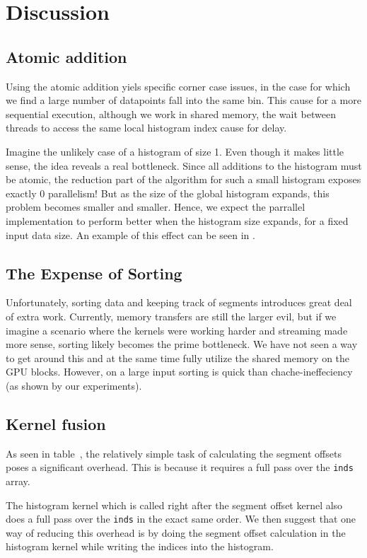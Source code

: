 \documentclass[12pt, a4paper, hidelinks]{article}
\renewcommand{\tt}[1]{\texttt{#1}}
\begin{document}
\section{Discussion}

\subsection{Atomic addition}
Using the atomic addition yiels specific corner case issues, 
in the case for which we find a large number of datapoints fall into the same bin. 
This cause for a more sequential execution, although we work in shared memory, 
the wait between threads to access the same local histogram index cause for delay.


Imagine the unlikely case of a histogram of size 1. Even though it makes little sense,
the idea reveals a real bottleneck. Since all additions to the
histogram must be atomic, the reduction part of the algorithm for
such a small histogram
exposes exactly 0 parallelism! But as the size of the global histogram
expands, this problem becomes smaller and smaller.
Hence, we expect the parrallel implementation to perform better when the
histogram size expands, for a fixed input data size.
An example of this effect can be seen in .

\subsection{The Expense of Sorting}
Unfortunately, sorting data and keeping track of segments
introduces great deal of extra work. Currently, memory transfers are still the larger evil, but if we imagine a scenario where the kernels were working harder and streaming made more sense, sorting likely becomes the prime bottleneck. We have not seen a way to get around this and at the same time fully utilize the shared memory on the GPU blocks. However, on a large input sorting is quick than chache-ineffeciency (as shown by our experiments).

\subsection{Kernel fusion}
As seen in table~, the relatively simple task of calculating the segment offsets
poses a significant overhead. This is because it requires a full pass over the \tt{inds} array.

The histogram kernel which is called right after the segment offset kernel also does a full
pass over the \tt{inds} in the exact same order. We then suggest that one way of reducing
this overhead is by doing the segment offset calculation in the histogram kernel while
writing the indices into the histogram.
\end{document}
